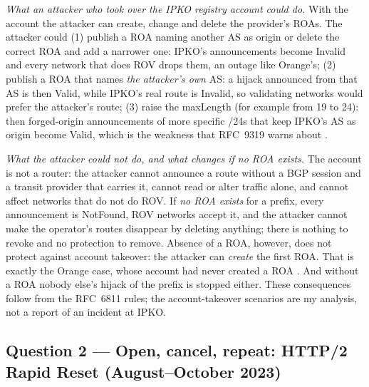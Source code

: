 \documentclass[11pt,a4paper]{article}
\begin{document}
\emph{What an attacker who took over the IPKO registry account could do.} With the account the attacker can create, change and delete the provider's ROAs. The attacker could
(1) publish a ROA naming another AS as origin or delete the correct ROA and add a narrower one: IPKO's announcements become Invalid and every network that does ROV drops
them, an outage like Orange's; (2) publish a ROA that names \emph{the attacker's own} AS: a hijack announced from that AS is then Valid, while IPKO's real route is Invalid, so
validating networks would prefer the attacker's route; (3) raise the maxLength (for example from 19 to 24): then forged-origin announcements of
more specific /24s that keep IPKO's AS as origin become Valid, which is the weakness that RFC~9319 warns about \cite{rfc9319}.

\emph{What the attacker could not do, and what changes if no ROA exists.} The account is not a router: the attacker cannot announce a route without a BGP session and a transit
provider that carries it, cannot read or alter traffic alone, and cannot affect networks that do not do ROV. If \emph{no ROA exists} for a prefix, every announcement
is NotFound, ROV networks accept it, and the attacker cannot make the operator's routes disappear by deleting anything; there is nothing to revoke
and no protection to remove. Absence of a ROA, however, does not protect against account takeover: the attacker can \emph{create} the first ROA. That is
exactly the Orange case, whose account had never created a ROA \cite{apnic}. And without a ROA nobody else's hijack of the prefix is stopped either. These
consequences follow from the RFC~6811 rules; the account-takeover scenarios are my analysis, not a report of an incident at IPKO.

\subsection*{Question 2 --- Open, cancel, repeat: HTTP/2 Rapid Reset (August--October 2023)}
\end{document}
